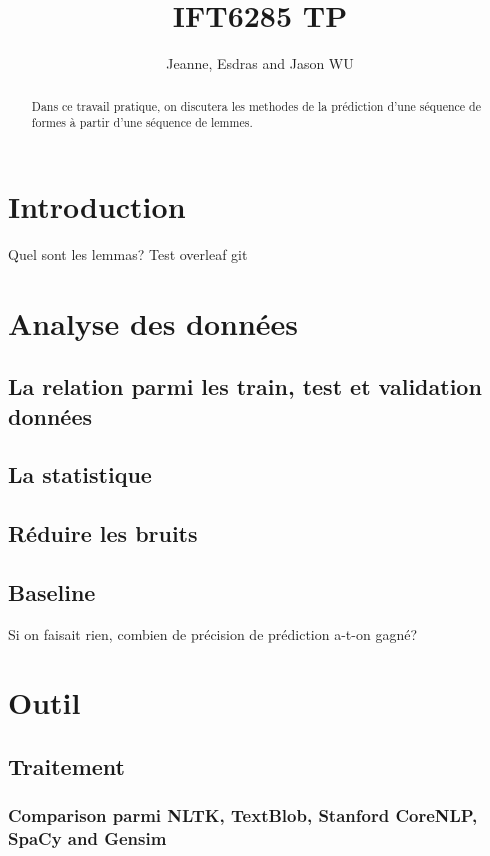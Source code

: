 \documentclass[a4paper]{article}
\title{IFT6285 TP}
\author{Jeanne, Esdras and Jason WU}
\begin{document}
\maketitle

\begin{abstract}
Dans ce travail pratique,  on discutera les methodes de la prédiction d'une séquence de formes à partir d'une séquence de lemmes.
\end{abstract}

\section{Introduction}
Quel sont les lemmas?
Test overleaf git

\section{Analyse des données}

\subsection{La relation parmi les train, test et validation données}

\subsection{La statistique}

\subsection{Réduire les bruits}

\subsection{Baseline}
Si on faisait rien, combien de précision de prédiction a-t-on gagné?

\section{Outil}
\subsection{Traitement}
\subsubsection{Comparison parmi NLTK, TextBlob, Stanford CoreNLP, SpaCy and Gensim}
\end{document}
